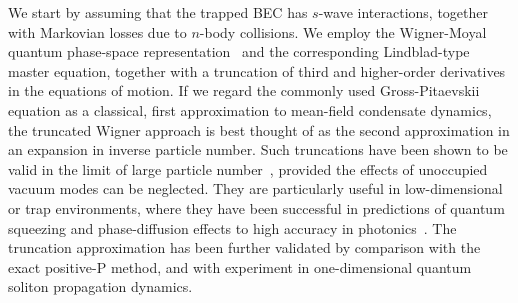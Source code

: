 \documentclass[aps,prl,twocolumn,showpacs,amsmath,amssymb,superscriptaddress]{revtex4-1}
\begin{document}
We start by assuming that the trapped BEC has $s$-wave interactions,
together with Markovian losses due to $n$-body collisions.
We employ the Wigner-Moyal quantum phase-space representation~\cite{Gardiner2004}
and the corresponding Lindblad-type master equation,
together with a truncation of third and higher-order derivatives in the equations of motion.
If we regard the commonly used Gross-Pitaevskii equation as a classical,
first approximation to mean-field condensate dynamics,
the truncated Wigner approach is best thought of as the second approximation
in an expansion in inverse particle number.
Such truncations have been shown to be valid in the limit of large particle number~\cite{Drummond1993,Steel1998,Sinatra2002},
provided the effects of unoccupied vacuum modes can be neglected.
They are particularly useful in low-dimensional or trap environments,
where they have been successful in predictions of quantum squeezing
and phase-diffusion effects to high accuracy in photonics~\cite{Corney2008}.
The truncation approximation has been further validated by comparison
with the exact positive-P method,
and with experiment in one-dimensional quantum soliton propagation dynamics.
\end{document}
